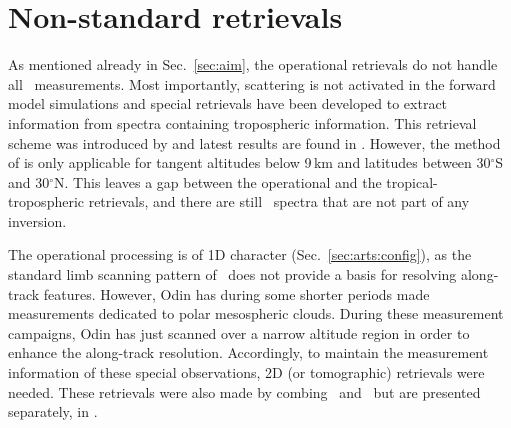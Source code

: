 \section{Non-standard retrievals}
\label{sec:nonstandard}
%
As mentioned already in Sec.~\ref{sec:aim}, the operational retrievals do not
handle all \smr\ measurements. Most importantly, scattering is not activated in
the forward model simulations and special retrievals have been developed to
extract information from spectra containing tropospheric information.
This retrieval scheme was introduced by \citet{rydberg:nonga:09} and latest
results are found in \citet{eriksson:overw:14}. However, the method of
\citet{rydberg:nonga:09} is only applicable for tangent altitudes below 9\,km
and latitudes between 30$^\circ$S and 30$^\circ$N. This leaves a gap between
the operational and the tropical-tropospheric retrievals, and there are
still \smr\ spectra that are not part of any inversion. 

The operational processing is of 1D character (Sec.~\ref{sec:arts:config}), as
the standard limb scanning pattern of \smr\ does not provide a basis for
resolving along-track features. However, Odin has during some shorter periods
made measurements dedicated to polar mesospheric clouds. During these
measurement campaigns, Odin has just scanned over a narrow altitude region in
order to enhance the along-track resolution. Accordingly, to maintain the
measurement information of these special observations, 2D (or tomographic)
retrievals were needed. These retrievals were also made by combing \OEM\ and
\ARTS\ but are presented separately, in \citet{christensen:tomog:15}.









